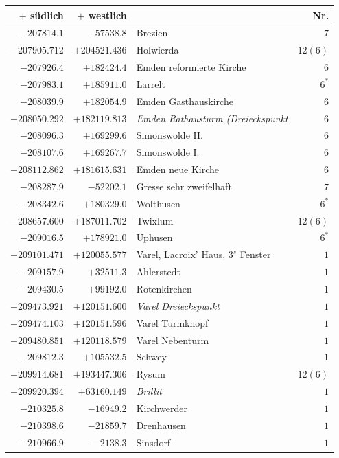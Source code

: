 \begin{center}\begingroup\fontsize{8}{9}\selectfont
\setlength{\tabcolsep}{4pt}
\begin{tabular}{r|r|p{170pt}|r}\hline
\(+\) südlich&\(+\) westlich&&Nr.\\\hline
\(-207814.1\)&\(-57538.8\)&Brezien&\(7\)\\
\(-207905.712\)&\(+204521.436\)&Holwierda&\(12 (6)\)\\
\(-207926.4\)&\(+182424.4\)&Emden reformierte Kirche&\(6\)\\
\(-207983.1\)&\(+185911.0\)&Larrelt&\(6^{*}\)\\
\(-208039.9\)&\(+182054.9\)&Emden Gasthauskirche&\(6\)\\
\(-208050.292\)&\(+182119.813\)&\textit{Emden Rathausturm (Dreieckspunkt}&\(6\)\\
\(-208096.3\)&\(+169299.6\)&Simonswolde II.&\(6\)\\
\(-208107.6\)&\(+169267.7\)&Simonswolde I.&\(6\)\\
\(-208112.862\)&\(+181615.631\)&Emden neue Kirche&\(6\)\\
\(-208287.9\)&\(-52202.1\)&Gresse sehr zweifelhaft&\(7\)\\
\(-208342.6\)&\(+180329.0\)&Wolthusen&\(6^{*}\)\\
\(-208657.600\)&\(+187011.702\)&Twixlum&\(12 (6)\)\\
\(-209016.5\)&\(+178921.0\)&Uphusen&\(6^{*}\)\\
\(-209101.471\)&\(+120055.577\)&Varel, Lacroix’ Haus, \(3^{s}\) Fenster&\(1\)\\
\(-209157.9\)&\(+32511.3\)&Ahlerstedt&\(1\)\\
\(-209430.5\)&\(+99192.0\)&Rotenkirchen&\(1\)\\
\(-209473.921\)&\(+120151.600\)&\textit{Varel Dreieckspunkt}&\(1\)\\
\(-209474.103\)&\(+120151.596\)&Varel Turmknopf&\(1\)\\
\(-209480.851\)&\(+120118.579\)&Varel Nebenturm&\(1\)\\
\(-209812.3\)&\(+105532.5\)&Schwey&\(1\)\\
\(-209914.681\)&\(+193447.306\)&Rysum&\(12 (6)\)\\
\(-209920.394\)&\(+63160.149\)&\textit{Brillit}&\(1\)\\
\(-210325.8\)&\(-16949.2\)&Kirchwerder&\(1\)\\
\(-210398.6\)&\(-21859.7\)&Drenhausen&\(1\)\\
\(-210966.9\)&\(-2138.3\)&Sinsdorf&\(1\)\\

\end{tabular}
\end{center}
